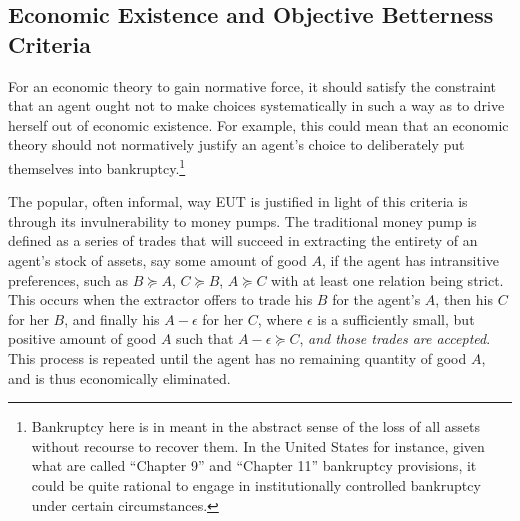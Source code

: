 \documentclass[../main.tex]{subfiles}
\begin{document}

\singlespacing
\subsection{Economic Existence and Objective Betterness Criteria}
\doublespacing

For an economic theory to gain normative force, it should satisfy the constraint that an agent ought not to make choices systematically in such a way as to drive herself out of economic existence.
For example, this could mean that an economic theory should not normatively justify an agent's choice to deliberately put themselves into bankruptcy.\footnote{
	Bankruptcy here is in meant in the abstract sense of the loss of all assets without recourse to recover them.
	In the United States for instance, given what are called \enquote{Chapter 9} and \enquote{Chapter 11} bankruptcy provisions, it could be quite rational to engage in institutionally controlled bankruptcy under certain circumstances.
}

The popular, often informal, way EUT is justified in light of this criteria is through its invulnerability to money pumps.
The traditional money pump is defined as a series of trades that will succeed in extracting the entirety of an agent's stock of assets, say some amount of good $A$, if the agent has intransitive preferences, such as $B \succcurlyeq A$, $C \succcurlyeq B$, $A \succcurlyeq C$ with at least one relation being strict.
This occurs when the extractor offers to trade his $B$ for the agent's $A$, then his $C$ for her $B$, and finally his $A - \epsilon$ for her $C$, where $\epsilon$ is a sufficiently small, but positive amount of good $A$ such that $A - \epsilon \succcurlyeq C$, \textit{and those trades are accepted}.
This process is repeated until the agent has no remaining quantity of good $A$, and is thus economically eliminated.
\end{document}
